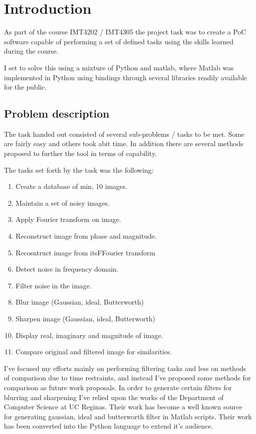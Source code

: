 \chapter{Introduction}\label{sec:intro}
As part of the course IMT4202 / IMT4305 the project task was to create a PoC
software capable of performing a set of defined tasks using the skills learned
during the course.

I set to solve this using a mixture of Python and matlab, where Matlab was
implemented in Python using bindings through several libraries readily available
for the public.

\section{Problem description}\label{sec:}
The task handed out consisted of several sub-problems / tasks to be met. Some
are fairly easy and others took abit time.  In addition there are several
methods proposed to further the tool in terms of capability.

The tasks set forth by the task was the following:
\begin{multicols}{2}
\begin{enumerate}
	\item Create a database of min, 10 images.
	\item Maintain a set of noisy images.

	\item Apply Fourier transform on image.
	\item Reconstruct image from phase and magnitude.
	\item Recosntruct image from itsFFourier transform
	\item Detect noise in frequency domain.
	
	\item Filter noise in the image.
	\item Blur image (Gaussian, ideal, Butterworth)
	\item Sharpen image (Gaussian, ideal, Butterworth)
	
	\item Display real, imaginary and magnitude of image.
	\item Compare original and filtered image for similarities.
\end{enumerate}
\end{multicols}


I've focused my efforts mainly on performing filtering tasks and less on
methods of comparison due to time restraints, and instead I've proposed some
methods for comparison as future work proposals.  In order to generate certain
filters for blurring and sharpening I've relied upon the works of the Department
of Computer Science at UC Reginas.  Their work has become a well known source
for generating gaussian, ideal and butterworth filter in Matlab scripts. Their
work has been converted into the Python language to extend it's audience.

